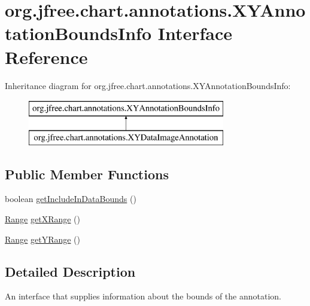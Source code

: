 \hypertarget{interfaceorg_1_1jfree_1_1chart_1_1annotations_1_1_x_y_annotation_bounds_info}{}\section{org.\+jfree.\+chart.\+annotations.\+X\+Y\+Annotation\+Bounds\+Info Interface Reference}
\label{interfaceorg_1_1jfree_1_1chart_1_1annotations_1_1_x_y_annotation_bounds_info}
Inheritance diagram for org.\+jfree.\+chart.\+annotations.\+X\+Y\+Annotation\+Bounds\+Info\+:\begin{figure}[H]
\begin{center}
\leavevmode
\includegraphics[height=2.000000cm]{interfaceorg_1_1jfree_1_1chart_1_1annotations_1_1_x_y_annotation_bounds_info}
\end{center}
\end{figure}
\subsection*{Public Member Functions}
\begin{DoxyCompactItemize}
\item 
boolean \mbox{\hyperlink{interfaceorg_1_1jfree_1_1chart_1_1annotations_1_1_x_y_annotation_bounds_info_adc1990dadc650880c4c3255c94fcb844}{get\+Include\+In\+Data\+Bounds}} ()
\item 
\mbox{\hyperlink{classorg_1_1jfree_1_1data_1_1_range}{Range}} \mbox{\hyperlink{interfaceorg_1_1jfree_1_1chart_1_1annotations_1_1_x_y_annotation_bounds_info_ae18c2d2a5ecd5f0dfc03d7b3e3240000}{get\+X\+Range}} ()
\item 
\mbox{\hyperlink{classorg_1_1jfree_1_1data_1_1_range}{Range}} \mbox{\hyperlink{interfaceorg_1_1jfree_1_1chart_1_1annotations_1_1_x_y_annotation_bounds_info_ac2b862c20ed8685be1b5c445abdf2f00}{get\+Y\+Range}} ()
\end{DoxyCompactItemize}


\subsection{Detailed Description}
An interface that supplies information about the bounds of the annotation.

